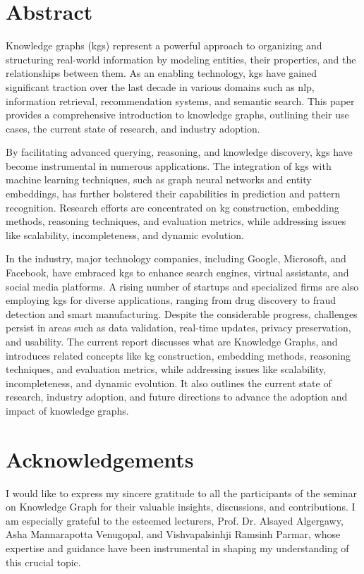 \documentclass[12pt]{article} %
\title{\thetitle}
\author{\theauthor}
\date{April-Mai 2023}
\begin{document}

\newpage


\section*{Abstract}
Knowledge graphs (\acrshort{kg}s) represent a powerful approach to organizing and structuring real-world information by modeling entities, their properties, and the relationships between them. As an enabling technology, \acrshort{kg}s have gained significant traction over the last decade in various domains such as \acrshort{nlp}, information retrieval, recommendation systems, and semantic search. This paper provides a comprehensive introduction to knowledge graphs, outlining their use cases, the current state of research, and industry adoption.

By facilitating advanced querying, reasoning, and knowledge discovery, \acrshort{kg}s have become instrumental in numerous applications. The integration of \acrshort{kg}s with machine learning techniques, such as graph neural networks and entity embeddings, has further bolstered their capabilities in prediction and pattern recognition. Research efforts are concentrated on \acrshort{kg} construction, embedding methods, reasoning techniques, and evaluation metrics, while addressing issues like scalability, incompleteness, and dynamic evolution.

In the industry, major technology companies, including Google, Microsoft, and Facebook, have embraced \acrshort{kg}s to enhance search engines, virtual assistants, and social media platforms. A rising number of startups and specialized firms are also employing \acrshort{kg}s for diverse applications, ranging from drug discovery to fraud detection and smart manufacturing. Despite the considerable progress, challenges persist in areas such as data validation, real-time updates, privacy preservation, and usability. The current report discusses what are Knowledge Graphs, and introduces related concepts like \acrshort{kg} construction, embedding methods, reasoning techniques, and evaluation metrics, while addressing issues like scalability, incompleteness, and dynamic evolution. It also outlines the current state of research, industry adoption, and future directions to advance the adoption and impact of knowledge graphs.

\section*{Acknowledgements}
I would like to express my sincere gratitude to all the participants of the seminar on Knowledge Graph for their valuable insights, discussions, and contributions. I am especially grateful to the esteemed lecturers, Prof. Dr. Alsayed Algergawy, Asha Mannarapotta Venugopal, and Vishvapalsinhji Ramsinh Parmar, whose expertise and guidance have been instrumental in shaping my understanding of this crucial topic. 
\end{document}
